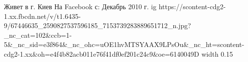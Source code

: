 
 
 
 
 

\par
Живет в г. Киев
На Facebook с: Декабрь 2010 г.
\ifcmt
  ig https://scontent-cdg2-1.xx.fbcdn.net/v/t1.6435-9/67446635_2590827537596185_7153739283889651712_n.jpg?_nc_cat=102&ccb=1-5&_nc_sid=e3f864&_nc_ohc=uOE1hvMTSYAAX9LPsOu&_nc_ht=scontent-cdg2-1.xx&oh=e4f4b82acb011e76f41df0ef201c24c9&oe=6140049D
  width 0.15
\fi

